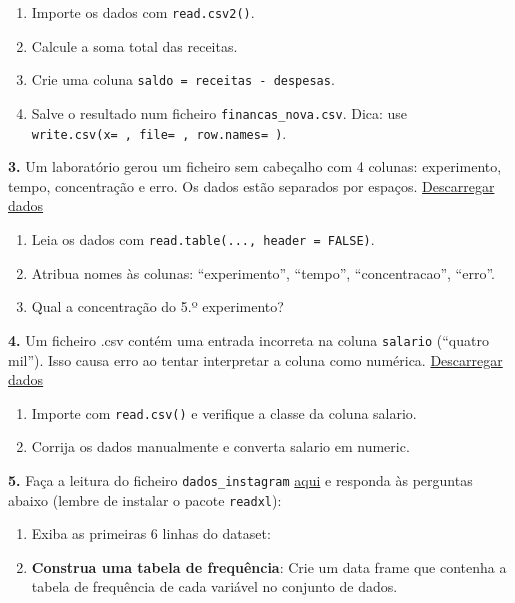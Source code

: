 \documentclass[
]{book}
\begin{document}
\begin{enumerate}
\def\labelenumi{(\alph{enumi})}
\item
  Importe os dados com \texttt{read.csv2()}.
\item
  Calcule a soma total das receitas.
\item
  Crie uma coluna \texttt{saldo\ =\ receitas\ -\ despesas}.
\item
  Salve o resultado num ficheiro \texttt{financas\_nova.csv}. Dica: use \texttt{write.csv(x=\ ,\ file=\ ,\ row.names=\ )}.
\end{enumerate}

\textbf{3.} Um laboratório gerou um ficheiro sem cabeçalho com 4 colunas: experimento, tempo, concentração e erro. Os dados estão separados por espaços. \href{docs/resultados_lab.txt}{Descarregar dados}

\begin{enumerate}
\def\labelenumi{(\alph{enumi})}
\item
  Leia os dados com \texttt{read.table(...,\ header\ =\ FALSE)}.
\item
  Atribua nomes às colunas: ``experimento'', ``tempo'', ``concentracao'', ``erro''.
\item
  Qual a concentração do 5.º experimento?
\end{enumerate}

\textbf{4.} Um ficheiro .csv contém uma entrada incorreta na coluna \texttt{salario} (``quatro mil''). Isso causa erro ao tentar interpretar a coluna como numérica. \href{docs/dados_com_erros.csv}{Descarregar dados}

\begin{enumerate}
\def\labelenumi{(\alph{enumi})}
\item
  Importe com \texttt{read.csv()} e verifique a classe da coluna salario.
\item
  Corrija os dados manualmente e converta salario em numeric.
\end{enumerate}

\textbf{5.} Faça a leitura do ficheiro \texttt{dados\_instagram} \href{https://renatorpaula.wixsite.com/renato/laboratorio-estatistica}{aqui} e responda às perguntas abaixo (lembre de instalar o pacote \texttt{readxl}):

\begin{enumerate}
\def\labelenumi{(\alph{enumi})}
\item
  Exiba as primeiras 6 linhas do dataset:
\item
  \textbf{Construa uma tabela de frequência}: Crie um data frame que contenha a tabela de frequência de cada variável no conjunto de dados.
\end{enumerate}
\end{document}

